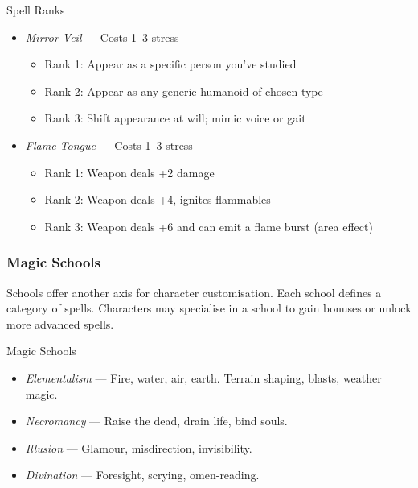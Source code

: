\begin{Example}{Spell Ranks}
    \begin{itemize}
        \item \textit{Mirror Veil} — Costs 1–3 stress
        \begin{itemize}
            \item Rank 1: Appear as a specific person you've studied
            \item Rank 2: Appear as any generic humanoid of chosen type
            \item Rank 3: Shift appearance at will; mimic voice or gait
        \end{itemize}
        
        \item \textit{Flame Tongue} — Costs 1–3 stress
        \begin{itemize}
            \item Rank 1: Weapon deals +2 damage
            \item Rank 2: Weapon deals +4, ignites flammables
            \item Rank 3: Weapon deals +6 and can emit a flame burst (area effect)
        \end{itemize}
    \end{itemize}
\end{Example}

\subsubsection{Magic Schools}

Schools offer another axis for character customisation. Each school defines a category of spells. Characters may specialise in a school to gain bonuses or unlock more advanced spells.

\begin{Example}{Magic Schools}
    \begin{itemize}
        \item \textit{Elementalism} — Fire, water, air, earth. Terrain shaping, blasts, weather magic.
        \item \textit{Necromancy} — Raise the dead, drain life, bind souls.
        \item \textit{Illusion} — Glamour, misdirection, invisibility.
        \item \textit{Divination} — Foresight, scrying, omen-reading.
    \end{itemize}
\end{Example}


